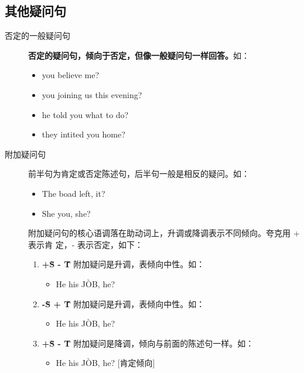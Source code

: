 \subsection{其他疑问句}
\begin{description}
\item[否定的一般疑问句] \textbf{否定的疑问句，倾向于否定，但像一般疑问句一样回答。}如：
  \begin{itemize}
  \item {} you believe me?

  \item {} you joining us this evening?

  \item {} he told you what to do?

  \item {} they  intited you home?
  \end{itemize}

\item[附加疑问句] 前半句为肯定或否定陈述句，后半句一般是相反的疑问。如：
  \begin{itemize}
  \item The boad  left,  it?
  \item She  you,  she?
  \end{itemize}

  附加疑问句的核心语调落在助动词上，升调或降调表示不同倾向。夸克用 + 表示肯
  定，- 表示否定，如下：
  \begin{enumerate}
  \item \textbf{+\`S - \'T} 附加疑问是升调，表倾向中性。如：
    \begin{itemize}
    \item He  his J\`OB,  he?
    \end{itemize}
  \item \textbf{-\`S + \'T} 附加疑问是升调，表倾向中性。如：
    \begin{itemize}
    \item He  his J\`OB,  he?
    \end{itemize}
  \item \textbf{+\`S - \`T} 附加疑问是降调，倾向与前面的陈述句一样。如：
    \begin{itemize}
    \item He  his J\`OB,  he? [肯定倾向]
    \end{itemize}


\end{enumerate}
\end{description}
